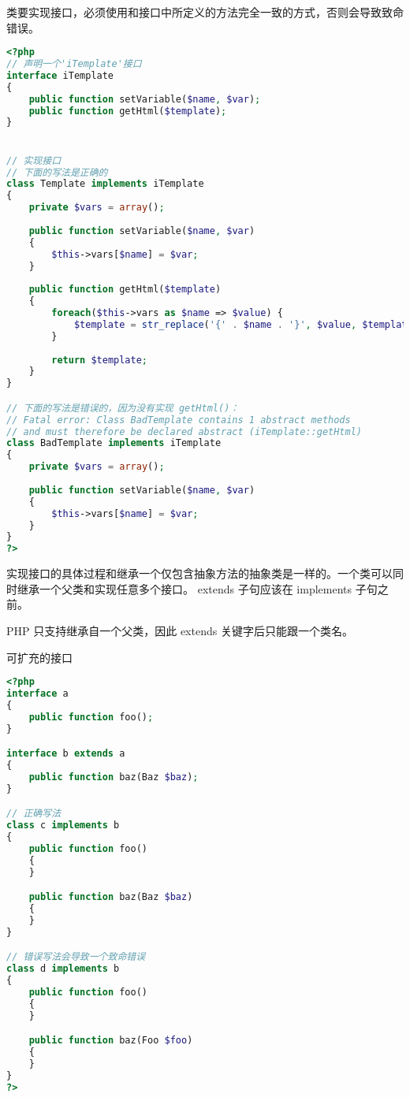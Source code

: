 类要实现接口，必须使用和接口中所定义的方法完全一致的方式，否则会导致致命错误。


\begin{lstlisting}[language=PHP]
<?php
// 声明一个'iTemplate'接口
interface iTemplate
{
    public function setVariable($name, $var);
    public function getHtml($template);
}


// 实现接口
// 下面的写法是正确的
class Template implements iTemplate
{
    private $vars = array();
  
    public function setVariable($name, $var)
    {
        $this->vars[$name] = $var;
    }
  
    public function getHtml($template)
    {
        foreach($this->vars as $name => $value) {
            $template = str_replace('{' . $name . '}', $value, $template);
        }
 
        return $template;
    }
}

// 下面的写法是错误的，因为没有实现 getHtml()：
// Fatal error: Class BadTemplate contains 1 abstract methods
// and must therefore be declared abstract (iTemplate::getHtml)
class BadTemplate implements iTemplate
{
    private $vars = array();
  
    public function setVariable($name, $var)
    {
        $this->vars[$name] = $var;
    }
}
?>
\end{lstlisting}

实现接口的具体过程和继承一个仅包含抽象方法的抽象类是一样的。一个类可以同时继承一个父类和实现任意多个接口。 extends 子句应该在 implements 子句之前。 

PHP 只支持继承自一个父类，因此 extends 关键字后只能跟一个类名。

\begin{example}
可扩充的接口
\begin{lstlisting}[language=PHP]
<?php
interface a
{
    public function foo();
}

interface b extends a
{
    public function baz(Baz $baz);
}

// 正确写法
class c implements b
{
    public function foo()
    {
    }

    public function baz(Baz $baz)
    {
    }
}

// 错误写法会导致一个致命错误
class d implements b
{
    public function foo()
    {
    }

    public function baz(Foo $foo)
    {
    }
}
?>
\end{lstlisting}
\end{example}

